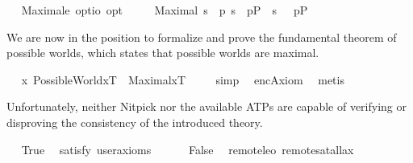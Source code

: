 \begin{isabellebody}
\ \isamarkupfalse%
\ Maximal{\isacharcolon}{\isacharcolon}{\isachardoublequoteopen}e\ opt{\isasymRightarrow}io\ opt{\isachardoublequoteclose}\ \ \isanewline
\ \ \ {\isachardoublequoteopen}Maximal\ s\ {\isasymequiv}\ {\isacharparenleft}\isactrlbold {\isasymforall}p{\isachardot}\ {\isacharparenleft}s\ {\isasymTurnstile}\ p\isactrlsup P{\isacharparenright}\ \isactrlbold {\isasymor}\ {\isacharparenleft}s\ {\isasymTurnstile}\ {\isacharparenleft}\isactrlbold {\isasymnot}\ p\isactrlsup P{\isacharparenright}{\isacharparenright}{\isacharparenright}{\isachardoublequoteclose}%
\begin{isamarkuptext}%
We are now in the position to formalize and prove the fundamental theorem of possible worlds,
  which states that possible worlds are maximal.%
\end{isamarkuptext}\isamarkuptrue%
\ \isamarkupfalse%
\ {\isachardoublequoteopen}{\isacharbrackleft}{\isacharparenleft}\isactrlbold {\isasymforall}x{\isachardot}\ PossibleWorld{\isacharparenleft}x\isactrlsup T{\isacharparenright}\ \isactrlbold {\isasymrightarrow}\ Maximal{\isacharparenleft}x\isactrlsup T{\isacharparenright}{\isacharparenright}{\isacharbrackright}\ {\isacharequal}\ {\isasymtop}{\isachardoublequoteclose}%
\isadelimproof
\ %
\endisadelimproof
%
\isatagproof
{}\isamarkupfalse%
\ simp\ \isamarkupfalse%
\ encAxiom{}\ \isamarkupfalse%
\ metis%
\endisatagproof
{\isafoldproof}%
%
\isadelimproof
%
\endisadelimproof
%
\isamarkuptrue%
%
\begin{isamarkuptext}%
Unfortunately, neither Nitpick nor the available
  ATPs are capable of verifying or disproving the consistency of the introduced theory.%
\end{isamarkuptext}\isamarkuptrue%
\ \isamarkupfalse%
\ True\ \isamarkupfalse%
\ {\isacharbrackleft}satisfy{\isacharcomma}\ user{\isacharunderscore}axioms{\isacharbrackright}%
\isadelimproof
\ %
\endisadelimproof
%
\isatagproof
{}\isamarkupfalse%
%
\endisatagproof
{\isafoldproof}%
%
\isadelimproof
%
\endisadelimproof
\ \isanewline
\ \isamarkupfalse%
\ False\ \isamarkupfalse%
\ {\isacharbrackleft}remote{\isacharunderscore}leo{}\ remote{\isacharunderscore}satallax{\isacharbrackright}%
\isadelimproof
\ %
\endisadelimproof
%
\isatagproof
{}\isamarkupfalse%
%
\endisatagproof
{\isafoldproof}%
%
\isadelimproof

\end{isabellebody}
